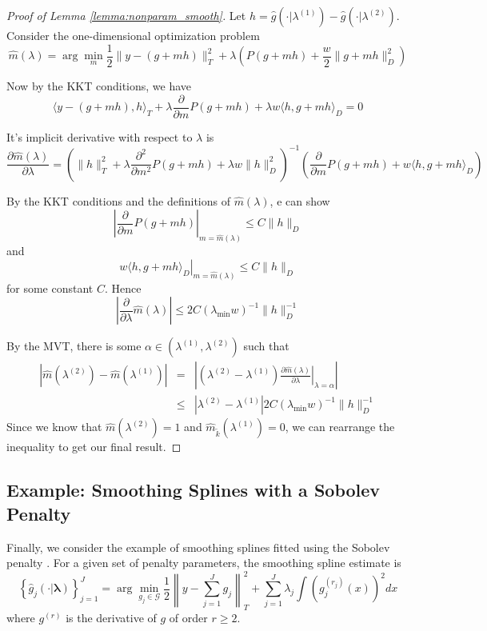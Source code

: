 \documentclass[12pt]{article}
\begin{document}
\begin{proof}[Proof of Lemma \ref{lemma:nonparam_smooth}]

Let $h=\hat{g}(\cdot|\lambda^{(1)})-\hat{g}(\cdot|\lambda^{(2)})$.
Consider the one-dimensional optimization problem
\[
\hat{m}(\lambda) = \arg\min_{m}\frac{1}{2}\|y- \left(g +mh\right)\|_{T}^{2}+\lambda\left(P(g+mh)+\frac{w}{2}\|g+mh\|_{D}^{2}\right)
\]

Now by the KKT conditions, we have
\[
\langle y-\left(g+mh\right),h\rangle_{T}+\lambda\frac{\partial}{\partial m}P(g+mh)+\lambda w \langle h,g+mh\rangle_{D}=0
\]


It's implicit derivative with respect to $\lambda$ is
\begin{equation}
 \frac{\partial\hat{m}(\lambda)}{\partial\lambda}  =
\left ( \| h\|_{T}^2 +\lambda\frac{\partial^{2}}{\partial m^{2}}P(g+mh) +\lambda w\|h\|_{D}^{2} \right )^{-1}
\left ( \frac{\partial}{\partial m}P(g+mh)+w\langle h,g+mh\rangle_{D} \right )
\end{equation}

By the KKT conditions and the definitions of $\hat{m}(\lambda)$, e can show
\[
\left | \frac{\partial}{\partial m}P(g+mh) \right |_{m = \hat{m}(\lambda)}  \le
C \|h\|_{D}
\]
and
$$
\left . w\langle h,g+mh\rangle_{D} \right |_{m = \hat{m}(\lambda)} \le C \|h\|_{D}
$$
for some constant $C$.
Hence
\[
\left|\frac{\partial}{\partial\lambda}\hat{m}(\lambda)\right| \le
2C (\lambda_{\min}w)^{-1}\|h\|_{D}^{-1}
\]

By the MVT, there is some $\alpha\in (\lambda^{(1)},\lambda^{(2)})$ such that
\begin{eqnarray*}
\left|\hat{m}(\lambda^{(2)})-\hat{m}(\lambda^{(1)})\right| & = &
\left|\left ( \lambda^{(2)}-\lambda^{(1)} \right )
\left . \frac{\partial \hat{m}(\lambda) }{\partial\lambda}\right |_{\lambda=\alpha} \right|\\
 & \le & |\lambda^{(2)}-\lambda^{(1)}|
2C (\lambda_{\min}w)^{-1}\|h\|_{D}^{-1}
\end{eqnarray*}
Since we know that $\hat{m}(\lambda^{(2)})=1$
and $\hat{m}_{\tilde{k}}(\lambda^{(1)})=0$, we can rearrange the inequality to get our final result.
\end{proof}


\subsection{Example: Smoothing Splines with a Sobolev Penalty}

Finally, we consider the example of smoothing splines fitted using the Sobolev penalty \citep{de1978practical, wahba1990spline, green1994nonparametric}. For a given set of penalty parameters, the smoothing spline estimate is
\begin{equation}
\label{ex:sobolev}
\left \{ \hat{g}_j(\cdot | \boldsymbol \lambda) \right \}_{j=1}^J =
\arg\min_{g_j\in\mathcal{G}}
\frac{1}{2} \left \|y- \sum_{j=1}^J g_j \right \|_{T}^{2}
+ \sum_{j=1}^J \lambda_j 
\int \left (g_j^{(r_j)}(x) \right )^2 dx
\end{equation}
where $g^{(r)}$ is the derivative of $g$ of order $r \ge 2$.
\end{document}
